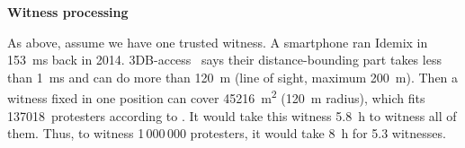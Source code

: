 

\textbf{Witness processing}

As above, assume we have one trusted witness.
A smartphone ran Idemix in \SI{153}{\milli\second} back in 2014.
3DB-access~\cite{3db-access} says their distance-bounding part takes less than 
\SI{1}{\milli\second} and can do more than \SI{120}{\metre} (line of sight, 
maximum \SI{200}{\metre}).
Then a witness fixed in one position can cover \SI{45216}{\square\metre} 
(\SI{120}{\metre} radius), which fits 137018~protesters according to 
\textcite{2016DemonstrationsInSeoul}.
It would take this witness \SI{5.8}{\hour} to witness all of them.
Thus, to witness 1\,000\,000 protesters, it would take \SI{8}{\hour} for 5.3 
witnesses.

